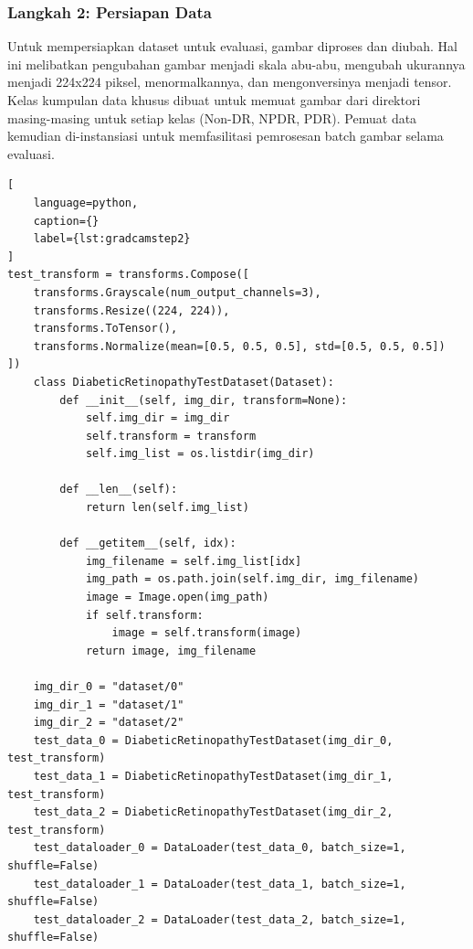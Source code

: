 \subsubsection{Langkah 2: Persiapan Data}
Untuk mempersiapkan dataset untuk evaluasi, gambar diproses dan diubah. 
Hal ini melibatkan pengubahan gambar menjadi skala abu-abu, mengubah ukurannya menjadi 224x224 piksel, menormalkannya, dan mengonversinya menjadi tensor. 
Kelas kumpulan data khusus dibuat untuk memuat gambar dari direktori masing-masing untuk setiap kelas (Non-DR, NPDR, PDR). 
Pemuat data kemudian di-instansiasi untuk memfasilitasi pemrosesan batch gambar selama evaluasi.

\begin{lstlisting}[
	language=python,
	caption={}
	label={lst:gradcamstep2}
]
test_transform = transforms.Compose([
    transforms.Grayscale(num_output_channels=3),
    transforms.Resize((224, 224)),
    transforms.ToTensor(),
    transforms.Normalize(mean=[0.5, 0.5, 0.5], std=[0.5, 0.5, 0.5])
])
	class DiabeticRetinopathyTestDataset(Dataset):
	    def __init__(self, img_dir, transform=None):
	        self.img_dir = img_dir
	        self.transform = transform
	        self.img_list = os.listdir(img_dir)

	    def __len__(self):
	        return len(self.img_list)

	    def __getitem__(self, idx):
	        img_filename = self.img_list[idx]
	        img_path = os.path.join(self.img_dir, img_filename)
	        image = Image.open(img_path)
	        if self.transform:
	            image = self.transform(image)
	        return image, img_filename

	img_dir_0 = "dataset/0"
	img_dir_1 = "dataset/1"
	img_dir_2 = "dataset/2"
	test_data_0 = DiabeticRetinopathyTestDataset(img_dir_0, test_transform)
	test_data_1 = DiabeticRetinopathyTestDataset(img_dir_1, test_transform)
	test_data_2 = DiabeticRetinopathyTestDataset(img_dir_2, test_transform)
	test_dataloader_0 = DataLoader(test_data_0, batch_size=1, shuffle=False)
	test_dataloader_1 = DataLoader(test_data_1, batch_size=1, shuffle=False)
	test_dataloader_2 = DataLoader(test_data_2, batch_size=1, shuffle=False)	
\end{lstlisting}

